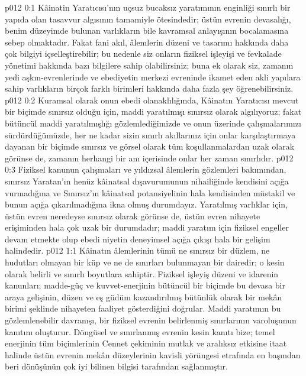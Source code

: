 \vs p012 0:1 Kâinatin Yaratıcısı’nın uçsuz bucaksız yaratımının enginliği sınırlı bir yapıda olan tasavvur algısının tamamiyle ötesindedir; üstün evrenin devasalığı, benim düzeyimde bulunan varlıkların bile kavramsal anlayışının bocalamasına sebep olmaktadır. Fakat fani akıl, âlemlerin düzeni ve tasarımı hakkında daha çok bilgiyi içselleştirebilir; bu nedenle siz onların fiziksel işleyişi ve fevkalade yönetimi hakkında bazı bilgilere sahip olabilirsiniz; buna ek olarak siz, zamanın yedi aşkın\hyp{}evrenlerinde ve ebediyetin merkezi evreninde ikamet eden akli yapılara sahip varlıkların birçok farklı birimleri hakkında daha fazla şey öğrenebilirsiniz.
\vs p012 0:2 Kuramsal olarak onun ebedi olanaklılığında, Kâinatın Yaratıcısı mevcut bir biçimde sınırsız olduğu için, maddi yaratılmışı sınırsız olarak algılıyoruz; fakat bütüncül maddi yaratılmışlığı gözlemlediğimizde ve onun üzerinde çalışmalarımızı sürdürdüğümüzde, her ne kadar sizin sınırlı akıllarınız için onlar karşılaştırmaya dayanan bir biçimde sınırsız ve görsel olarak tüm koşullanmalardan uzak olarak görünse de, zamanın herhangi bir anı içerisinde onlar her zaman sınırlıdır.
\vs p012 0:3 Fiziksel kanunun çalışmaları ve yıldızsal âlemlerin gözlemleri bakımından, sınırsız Yaratan’ın henüz kâinatsal dışavurumunun nihailiğinde kendisini açığa vurmadığına ve Sınırsız’ın kâinatsal potansiyelinin hala kendisinden müstakil ve bunun açığa çıkarılmadığına ikna olmuş durumdayız. Yaratılmış varlıklar için, üstün evren neredeyse sınırsız olarak görünse de, üstün evren nihayete erişiminden hala çok uzak bir durumdadır; maddi yaratım için fiziksel engeller devam etmekte olup ebedi niyetin deneyimsel açığa çıkışı hala bir gelişim halindedir.
\vs p012 1:1 Kâinatın âlemlerinin tümü ne sınırsız bir düzlem, ne hudutları olmayan bir küp ve ne de sınırları bulunmayan bir dairedir; o kesin olarak belirli ve sınırlı boyutlara sahiptir. Fiziksel işleyiş düzeni ve idarenin kanunları; madde\hyp{}güç ve kuvvet\hyp{}enerjinin bütüncül bir biçimde bu devasa bir araya gelişinin, düzen ve eş güdüm kazandırılmış bütünlük olarak bir mekân birimi şeklinde nihayeten faaliyet gösterdiğini doğrular. Maddi yaratımın bu gözlemlenebilir davranışı, bir fiziksel evrenin belirlenmiş sınırlarının varoluşunun kanıtını oluşturur. Döngüsel ve sınırlanmış evrenin kesin kanıtı bize; temel enerjinin tüm biçimlerinin Cennet çekiminin mutlak ve aralıksız etkisine itaat halinde üstün evrenin mekân düzeylerinin kavisli yörüngesi etrafında en başından beri dönüşünün çok iyi bilinen bilgisi tarafından sağlanmıştır.
